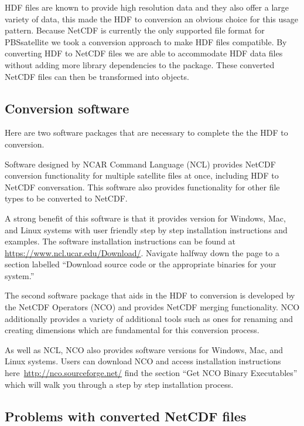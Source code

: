 \documentclass[11pt]{report}
\begin{document}
HDF files are known to provide high resolution data and they also offer a large variety of data, this made the HDF to  conversion an obvious choice for this usage pattern.
Because NetCDF is currently the only supported file format for PBSsatellite we took a conversion approach to make HDF files compatible.
By converting HDF to NetCDF files we are able to accommodate HDF data files without adding more library dependencies to the package.
These converted NetCDF files can then be transformed into  objects.

\subsection{Conversion software}
\label{s:software}

Here are two software packages that are necessary to complete the the HDF to  conversion.

Software designed by NCAR Command Language (NCL) provides NetCDF conversion functionality for multiple satellite files at once, including HDF to NetCDF conversation.
This software also provides functionality for other file types to be converted to NetCDF.

A strong benefit of this software is that it provides version for Windows, Mac, and Linux systems with user friendly step by step installation instructions and examples.
The software installation instructions can be found at \url{https://www.ncl.ucar.edu/Download/}.
Navigate halfway down the page to a section labelled ``Download source code or the appropriate binaries for your system.''

The second software package that aids in the HDF to  conversion is developed by the NetCDF Operators (NCO) and provides NetCDF merging functionality.
NCO additionally provides a variety of additional tools such as ones for renaming and creating dimensions which are fundamental for this conversion process.

As well as NCL, NCO also provides software versions for Windows, Mac, and Linux systems.
Users can download NCO and access installation instructions here~\url{http://nco.sourceforge.net/} find the section ``Get NCO Binary Executables'' which will walk you through a step by step installation process.

\subsection{Problems with converted NetCDF files}
\label{s:problemsNetCDF}
\end{document}
